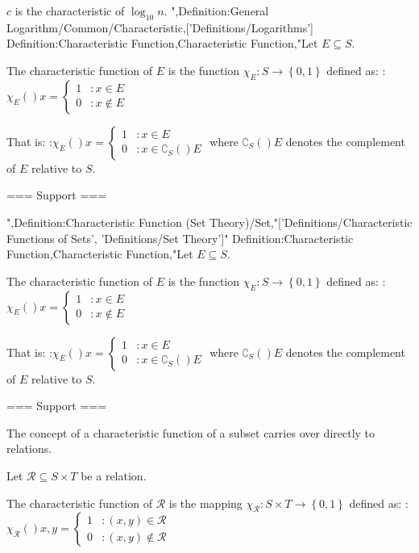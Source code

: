 $c$ is the characteristic of $\log_{10} n$.
",Definition:General Logarithm/Common/Characteristic,['Definitions/Logarithms']
Definition:Characteristic Function,Characteristic Function,"Let $E \subseteq S$.

The characteristic function of $E$ is the function $\chi_E: S \to \left\lbrace 0, 1 \right\rbrace$ defined as:
:$\chi_E \left(   \right)x = \begin {cases} 1 & : x \in E  \\  0 & : x \notin E \end {cases}$

That is:
:$\chi_E \left(   \right)x = \begin {cases} 1 & : x \in E  \\ 0 & : x \in \complement_{S} \left(   \right)E \end {cases}$
where $\complement_{S} \left(   \right)E$ denotes the complement of $E$ relative to $S$.


=== Support ===

",Definition:Characteristic Function (Set Theory)/Set,"['Definitions/Characteristic Functions of Sets', 'Definitions/Set Theory']"
Definition:Characteristic Function,Characteristic Function,"Let $E \subseteq S$.

The characteristic function of $E$ is the function $\chi_E: S \to \left\lbrace 0, 1 \right\rbrace$ defined as:
:$\chi_E \left(   \right)x = \begin {cases} 1 & : x \in E  \\  0 & : x \notin E \end {cases}$

That is:
:$\chi_E \left(   \right)x = \begin {cases} 1 & : x \in E  \\ 0 & : x \in \complement_{S} \left(   \right)E \end {cases}$
where $\complement_{S} \left(   \right)E$ denotes the complement of $E$ relative to $S$.


=== Support ===

The concept of a characteristic function of a subset carries over directly to relations.


Let $\mathcal R \subseteq S \times T$ be a relation.

The characteristic function of $\mathcal R$ is the mapping $\chi_\mathcal R: S \times T \to \left\lbrace 0, 1 \right\rbrace$ defined as:
:$\chi_\mathcal R \left(   \right){x, y} = \begin {cases} 1 & : \left( x, y \right) \in \mathcal R \\ 0 & : \left( x, y \right) \notin \mathcal R \end{cases}$


